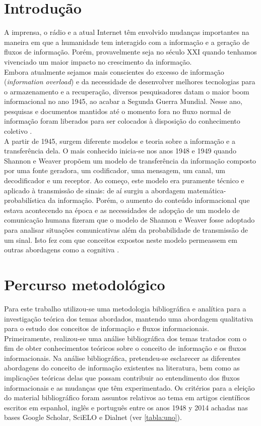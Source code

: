 \documentclass[a4paper,11pt]{article}
\begin{document}
\cleardoublepage
\section{Introdução}

A imprensa, o rádio e a atual Internet têm envolvido mudanças importantes na
maneira em que a humanidade tem interagido com a informação e a geração de fluxos de
informação. Porém, provavelmente seja no século XXI quando tenhamos vivenciado um maior
impacto no crescimento da informação. \\

Embora atualmente sejamos mais conscientes do excesso de informação (\textit{information
overload}) e da necessidade de desenvolver melhores tecnologias para o armazenamento e a
recuperação, diversos pesquisadores datam o maior boom informacional no ano 1945, ao
acabar a Segunda Guerra Mundial. Nesse ano, pesquisas e documentos mantidos até o
momento fora no fluxo normal de informação foram liberados para ser colocados à disposição
do conhecimento coletivo \cite{barr1}. \\

A partir de 1945, surgem diferente modelos e teoria sobre a informação e a
transferência dela. O mais conhecido inicia-se nos anos 1948 e 1949 quando Shannon e
Weaver propõem um modelo de transferência da informação composto por uma fonte
geradora, um codificador, uma mensagem, um canal, um decodificador e um receptor. Ao
começo, este modelo era puramente técnico e aplicado à transmissão de sinais: de aí surgiu a
abordagem matemática-probabilística da informação. Porém, o aumento do conteúdo
informacional que estava acontecendo na época e as necessidades de adopção de um modelo
de comunicação humana fizeram que o modelo de Shannon e Weaver fosse adoptado para
analisar situações comunicativas além da probabilidade de transmissão de um sinal. Isto fez
com que conceitos expostos neste modelo permeassem em outras abordagens como a
cognitiva \cite{belk}.\\

\section{Percurso metodológico}

Para este trabalho utilizou-se uma metodologia bibliográfica e analítica para a
investigação teórica dos temas abordados, mantendo uma abordagem qualitativa para o
estudo dos conceitos de informação e fluxos informacionais.\\
Primeiramente, realizou-se uma análise bibliográfica dos temas tratados com o fim de
obter conhecimentos teóricos sobre o conceito de informação e os fluxos informacionais. Na
análise bibliográfica, pretendeu-se esclarecer as diferentes abordagens do conceito de
informação existentes na literatura, bem como as implicações teóricas delas que possam 
contribuir ao entendimento dos fluxos informacionais e as mudanças que têm experimentado.
Os critérios para a eleição do material bibliográfico foram assuntos relativos ao tema em
artigos científicos escritos em espanhol, inglês e português entre os anos 1948 y 2014 achadas
nas bases Google Scholar, SciELO e Dialnet (ver \ref{tabla:uno}).\\
\end{document}

